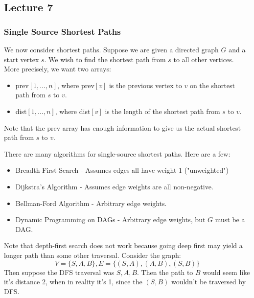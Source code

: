 \subsection{Lecture 7}

\subsubsection{Single Source Shortest Paths}

We now consider shortest paths. Suppose we are given
a directed graph $G$ and a start vertex $s$. We wish to find the shortest path from $s$ to all other vertices. More precisely,
we want two arrays:
\begin{itemize}
    \item prev$[1, \dots, n]$, where prev$[v]$ is the previous vertex to $v$ on the shortest path from $s$ to $v$.
    \item dist$[1, \dots, n]$, where dist$[v]$ is the length of the shortest path from $s$ to $v$.
\end{itemize}

Note that the prev array has enough information to give us the actual shortest path from $s$ to $v$.

There are many algorithms for single-source shortest paths. Here are a few:

\begin{itemize}
    \item Breadth-First Search - Assumes edges all have weight 1 ("unweighted")
    \item Dijkstra's Algorithm - Assumes edge weights are all non-negative.
    \item Bellman-Ford Algorithm - Arbitrary edge weights.
    \item Dynamic Programming on DAGs - Arbitrary edge weights, but $G$ must be a DAG.
\end{itemize}

Note that depth-first search does not work because going deep first may yield a longer path than some other traversal. Consider the graph:
\[ V = \{S, A, B \}, E = \{(S, A), (A, B), (S, B)\} \]
Then suppose the DFS traversal was $S, A, B$. Then the path to $B$ would seem like it's distance 2, when in reality it's 1, since the $(S,B)$ wouldn't be traversed by DFS.

